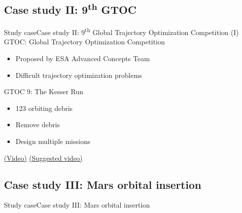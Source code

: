 \documentclass[10pt,compress]{beamer} %
\begin{document}
\subsection{Case study II: 9\textsuperscript{th} GTOC}
\begin{frame}{Study case}{Case study II: 9\textsuperscript{th} Global Trajectory Optimization Competition (I)}
    GTOC: Global Trajectory Optimization Competition
    \begin{itemize}
        \item Proposed by ESA Advanced Concepts Team
        \item Difficult trajectory optimization problems
    \end{itemize}
    GTOC 9: The Kesser Run
    \begin{itemize}
        \item 123 orbiting debris
        \item Remove debris
        \item Design multiple missions
    \end{itemize}
    \href{https://www.youtube.com/watch?v=zvxZx-QnqQ0}{(Video)}
    \href{https://www.youtube.com/watch?v=5CQNG6OIbZM}{(Suggested video)}
\end{frame}

\subsection{Case study III: Mars orbital insertion}
\begin{frame}{Study case}{Case study III: Mars orbital insertion}
    \setlength{\fboxrule}{0pt}
\end{frame}
\end{document}
